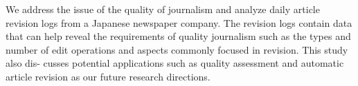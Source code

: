 We address the issue of the quality of journalism and analyze daily article revision logs from a Japanese newspaper company. The revision logs contain data that can help reveal the requirements of quality journalism such as the types and number of edit operations and aspects commonly focused in revision. This study also dis- cusses potential applications such as quality assessment and automatic article revision as our future research directions.
